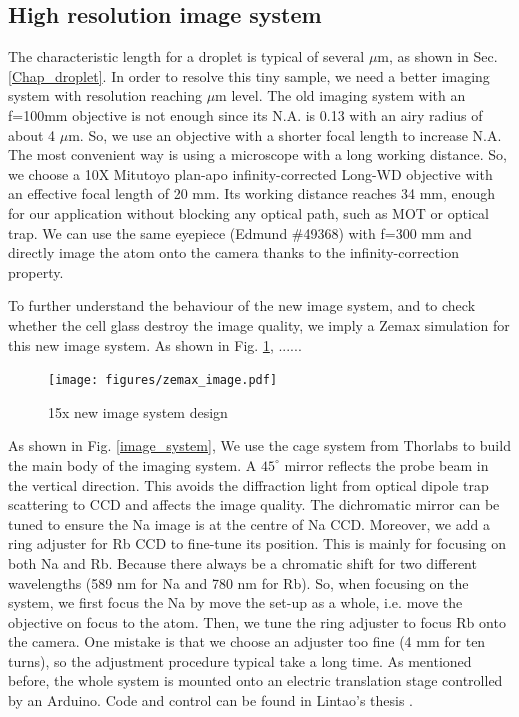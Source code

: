 \subsection{High resolution image system}
The characteristic length for a droplet is typical of several $\mu$m, as shown in Sec. \ref{Chap_droplet}. In order to resolve this tiny sample, we need a better imaging system with resolution reaching $\mu$m level. The old imaging system with an f=100mm objective is not enough since its N.A. is 0.13 with an airy radius of about 4 $\mu$m. So, we use an objective with a shorter focal length to increase N.A. The most convenient way is using a microscope with a long working distance. So, we choose a 10X Mitutoyo plan-apo infinity-corrected Long-WD objective with an effective focal length of 20 mm. Its working distance reaches 34 mm, enough for our application without blocking any optical path, such as MOT or optical trap. We can use the same eyepiece (Edmund \#49368) with f=300 mm and directly image the atom onto the camera thanks to the infinity-correction property. 

To further understand the behaviour of the new image system, and to check whether the cell glass destroy the image quality, we imply a Zemax simulation for this new image system. As shown in Fig. \ref{zemax_image}, ......


\begin{figure}[htb]
\begin{center}
\texttt{[image: figures/zemax\_image.pdf]}
\end{center}
\caption[15x new image system design]{15x new image system design}
\label{zemax_image}
\end{figure}

As shown in Fig. \ref{image_system}, We use the cage system from Thorlabs to build the main body of the imaging system. A $45^\circ$ mirror reflects the probe beam in the vertical direction. This avoids the diffraction light from optical dipole trap scattering to CCD and affects the image quality. The dichromatic mirror can be tuned to ensure the Na image is at the centre of Na CCD. Moreover, we add a ring adjuster for Rb CCD to fine-tune its position. This is mainly for focusing on both Na and Rb. Because there always be a chromatic shift for two different wavelengths (589 nm for Na and 780 nm for Rb). So, when focusing on the system, we first focus the Na by move the set-up as a whole, i.e. move the objective on focus to the atom. Then, we tune the ring adjuster to focus Rb onto the camera. One mistake is that we choose an adjuster too fine (4 mm for ten turns), so the adjustment procedure typical take a long time. As mentioned before, the whole system is mounted onto an electric translation stage controlled by an Arduino. Code and control can be found in Lintao's thesis \cite{LiLintao2021}.

